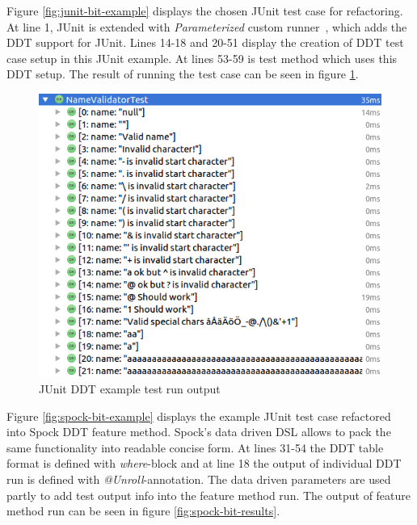     \restoregeometry

    Figure \ref{fig:junit-bit-example} displays the chosen JUnit test case for refactoring. At line 1, JUnit is extended with
    \textit{Parameterized} custom runner~\cite{junit-parameterized}, which adds the DDT support for JUnit.
    Lines 14-18 and 20-51 display the creation
    of DDT test case setup in this JUnit example. At lines 53-59 is test method which uses this DDT setup. The result of running
    the test case can be seen in figure \ref{fig:junit-bit-results}.

    \begin{figure}[H]
      \begin{center}
        \begin{topbot}[style=mdstyle]
        \includegraphics[width=\textwidth]{images/junit-validator-results.png}
        \end{topbot}
        \caption{JUnit DDT example test run output}
        \label{fig:junit-bit-results}
      \end{center}
    \end{figure}

    Figure \ref{fig:spock-bit-example} displays the example JUnit test case refactored into Spock DDT feature method. Spock's
    data driven DSL allows to pack the same functionality into readable concise form.  At lines 31-54 the DDT table format
    is defined with \textit{where}-block and at line 18 the output of individual DDT run is defined with \textit{@Unroll}-annotation.
    The data driven parameters are used partly
    to add test output info into the feature method run. The output of feature method run can
    be seen in figure \ref{fig:spock-bit-results}.

